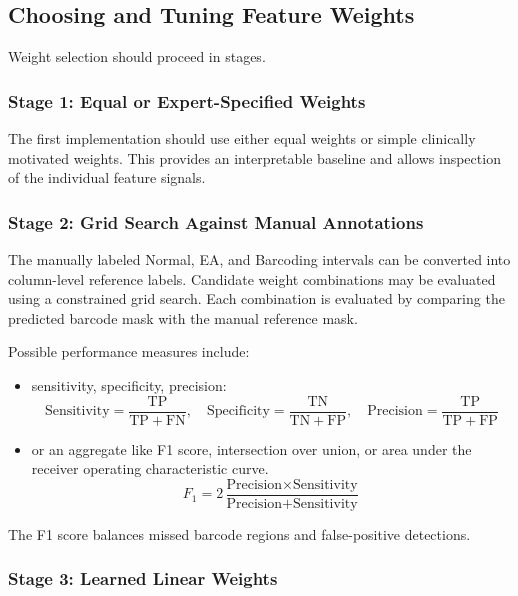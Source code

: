 \documentclass[11pt]{article}
\begin{document}
\subsection{Choosing and Tuning Feature Weights}

Weight selection should proceed in stages.

\subsubsection{Stage 1: Equal or Expert-Specified Weights}
The first implementation should use either equal weights or simple
clinically motivated weights. This provides an interpretable baseline and
allows inspection of the individual feature signals.

\subsubsection{Stage 2: Grid Search Against Manual Annotations}
The manually labeled Normal, EA, and Barcoding intervals can be converted into
column-level reference labels.
Candidate weight combinations may be evaluated using a constrained grid search.
Each combination is evaluated by comparing the predicted barcode mask with the
manual reference mask.

Possible performance measures include:

\begin{itemize}
    \item sensitivity, specificity, precision:
    \[
    \text{Sensitivity}
    =
    \frac{\mathrm{TP}}
    {\mathrm{TP}+\mathrm{FN}},
    \quad
    \text{Specificity}
    =
    \frac{\mathrm{TN}}
    {\mathrm{TN}+\mathrm{FP}},
    \quad
    \text{Precision}
    =
    \frac{\mathrm{TP}}
    {\mathrm{TP}+\mathrm{FP}}
    \]
    \item or an aggregate like F1 score, intersection over union, or area under the receiver operating characteristic curve.
    \[
    F_1
    =
    2
    \frac{
    \text{Precision}\times\text{Sensitivity}
    }{
    \text{Precision}+\text{Sensitivity}
    }
    \]
\end{itemize}
The F1 score balances missed barcode regions and false-positive detections.

\subsubsection{Stage 3: Learned Linear Weights}
\end{document}
